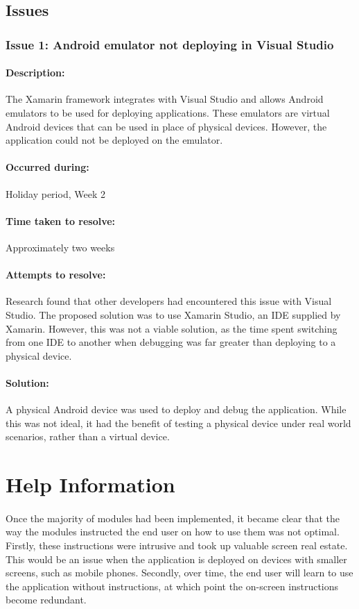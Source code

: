 	\subsection{Issues}{
		\subsubsection{Issue 1: Android emulator not deploying in Visual Studio}{
			\paragraph{Description:}
			The Xamarin framework integrates with Visual Studio and allows Android emulators to be used for deploying applications. These emulators are virtual Android devices that can be used in place of physical devices. However, the application could not be deployed on the emulator.    
			\paragraph{Occurred during:}
			Holiday period, Week 2
			\paragraph{Time taken to resolve:}
			Approximately two weeks
			\paragraph{Attempts to resolve:}
			Research found that other developers had encountered this issue with Visual Studio. The proposed solution was to use Xamarin Studio, an IDE supplied by Xamarin. However, this was not a viable solution, as the time spent switching from one IDE to another when debugging was far greater than deploying to a physical device. 
			\paragraph{Solution:}
			A physical Android device was used to deploy and debug the application. While this was not ideal, it had the benefit of testing a physical device under real world scenarios, rather than a virtual device.
	}
	\label{ssec:AndroidIssues}


\section{Help Information}
		\paragraph{}{
		Once the majority of modules had been implemented, it became clear that the way the modules instructed the end user on how to use them was not optimal. Firstly, these instructions were intrusive and took up valuable screen real estate. This would be an issue when the application is deployed on devices with smaller screens, such as mobile phones. Secondly, over time, the end user will learn to use the application without instructions, at which point the on-screen instructions become redundant.
		}
}

